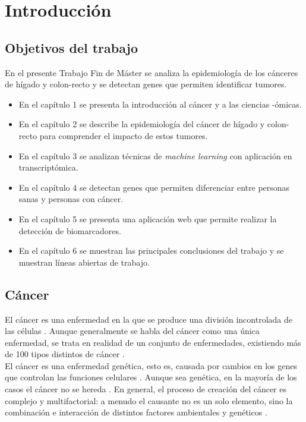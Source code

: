 \chapter{Introducción}

\section{Objetivos del trabajo}

En el presente Trabajo Fin de Máster se analiza la epidemiología de los cánceres de hígado y colon-recto y se detectan genes que permiten identificar tumores.

\begin{itemize}
	\item En el capítulo 1 se presenta la introducción al cáncer y a las ciencias -ómicas.
	\item En el capítulo 2 se describe la epidemiología del cáncer de hígado y colon-recto para comprender el impacto de estos tumores.
	\item En el capítulo 3 se analizan técnicas de \textit{machine learning} con aplicación en transcriptómica.
	\item En el capítulo 4 se detectan genes que permiten diferenciar entre personas sanas y personas con cáncer.
	\item En el capítulo 5 se presenta una aplicación web que permite realizar la detección de biomarcadores.
	\item En el capítulo 6 se muestran las principales conclusiones del trabajo y se muestran líneas abiertas de trabajo.
\end{itemize}


\section{Cáncer}

El cáncer es una enfermedad en la que se produce una división incontrolada de las células \cite{AmericanCancerSociety2015}. Aunque generalmente se habla del cáncer como una única enfermedad, se trata en realidad de un conjunto de enfermedades, existiendo más de 100 tipos distintos de cáncer \cite{NationalCancerInstitute2015}.\\

El cáncer es una enfermedad genética, esto es, causada por cambios en los genes que controlan las funciones celulares \cite{NationalCancerInstitute2015}. Aunque sea genética, en la mayoría de los casos el cáncer no se hereda \cite{Pierce2010}. En general, el proceso de creación del cáncer es complejo y multifactorial: a menudo el causante no es un solo elemento, sino la combinación e interacción de distintos factores ambientales y genéticos \cite{Migliore2012}. \\

